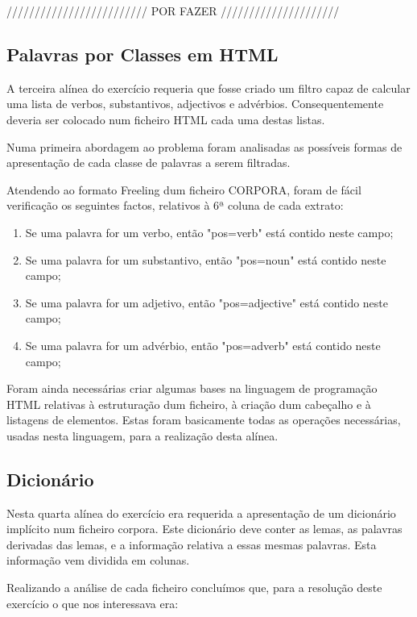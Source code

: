 \documentclass[11pt,a4paper]{report}
\begin{document}
///////////////////////// POR FAZER /////////////////////



\subsection{Palavras por Classes em HTML}

A terceira alínea do exercício requeria que fosse criado um filtro capaz de calcular uma lista de verbos, substantivos, adjectivos e advérbios. Consequentemente deveria ser colocado num ficheiro HTML cada uma destas listas.

Numa primeira abordagem ao problema foram analisadas as possíveis formas de apresentação de cada classe de palavras a serem filtradas.

Atendendo ao formato Freeling dum ficheiro CORPORA, foram de fácil verificação os seguintes factos, relativos à 6ª coluna de cada extrato:

\begin{enumerate}
 \item Se uma palavra for um verbo, então "pos=verb" está contido neste campo;
 \item Se uma palavra for um substantivo, então "pos=noun" está contido neste campo;
 \item Se uma palavra for um adjetivo, então "pos=adjective" está contido neste campo;
 \item Se uma palavra for um advérbio, então "pos=adverb" está contido neste campo;
\end{enumerate}

Foram ainda necessárias criar algumas bases na linguagem de programação HTML relativas à estruturação dum ficheiro, à criação dum cabeçalho e à listagens de elementos. Estas foram basicamente todas as operações necessárias, usadas nesta linguagem, para a realização desta alínea.


\subsection{Dicionário}
\label{subsec:analise4}

Nesta quarta alínea do exercício era requerida a apresentação de um dicionário implícito num ficheiro corpora. Este dicionário deve conter as lemas, as palavras derivadas das lemas, e a informação relativa a essas mesmas palavras. Esta informação vem dividida em colunas.

Realizando a análise de cada ficheiro concluímos que, para a resolução deste exercício o que nos interessava era:
\end{document}
